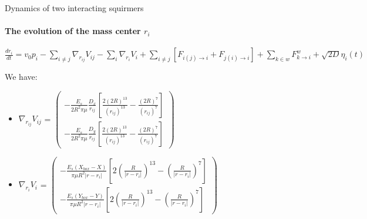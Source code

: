 \documentclass{beamer}
\begin{document}
\begin{frame}{Dynamics of two interacting squirmers}
    \framesubtitle{The evolution of the mass center $r_i$}
    \begin{center}
        \footnotesize
        $\boxed{\frac{dr_i}{dt} = v_0 p_i -  \sum\limits_{i \ne j}\nabla_{r_{ij}} V_{ij} - \sum\limits_{i}\nabla_{r_i} V_i + \sum\limits_{i\ne j}\left[F_{i(j)\rightarrow i} + F_{j(i)\rightarrow i}\right]+ \sum\limits_{k \in w}F_{k\rightarrow i}^w + \sqrt{2D}\eta_i(t)}$
    \end{center}
    We have: 
    \begin{itemize}
        \item $\nabla_{r_{ij}} V_{ij}$ = 
        $\begin{pmatrix}
            -\frac{E_s}{2R^2\pi\mu} \frac{D_x}{r_{ij}}\left[ \frac{2(2R)^{13}}{(r_{ij})^{13}} - \frac{(2R)^7}{(r_{ij})^7} \right] \\
            -\frac{E_s}{2R^2\pi\mu} \frac{D_y}{r_{ij}}\left[ \frac{2(2R)^{13}}{(r_{ij})^{13}} - \frac{(2R)^7}{(r_{ij})^7} \right]
        \end{pmatrix}$
        \item $\nabla_{r_i} V_i$ = $\begin{pmatrix}
            - \frac{E_s (X_{box}-X)}{\pi\mu R^2 \lvert r - r_i \rvert } \left[ 2 \left( \frac{R}{\lvert r-r_i\rvert} \right)^{13} - \left( \frac{R}{\lvert r-r_i\rvert}\right)^7 \right] \\
            - \frac{E_s (Y_{box}-Y)}{\pi\mu R^2 \lvert r - r_i \rvert } \left[ 2 \left( \frac{R}{\lvert r-r_i\rvert} \right)^{13} - \left( \frac{R}{\lvert r-r_i\rvert}\right)^7 \right]
        \end{pmatrix}$
    \end{itemize}
\end{frame}
\end{document}
